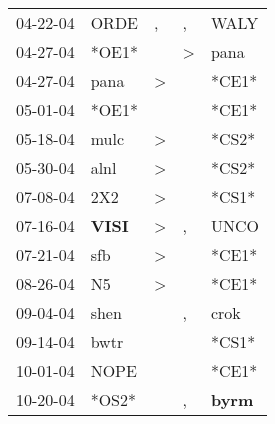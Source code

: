 \begin{supertabular}{p{0.07\textwidth}p{0.06\textwidth}p{0.02\textwidth}p{0.02\textwidth}p{0.06\textwidth}}
          04-22-04\textsuperscript{} &           ORDE\textsuperscript{} &                , &                , &           WALY\textsuperscript{} \\
          04-27-04\textsuperscript{} &                            *OE1* &                  &     \textgreater &           pana\textsuperscript{} \\
          04-27-04\textsuperscript{} &           pana\textsuperscript{} &     \textgreater &                  &                            *CE1* \\
          05-01-04\textsuperscript{} &                            *OE1* &                  &                  &                            *CE1* \\
          05-18-04\textsuperscript{} &           mulc\textsuperscript{} &     \textgreater &                  &                            *CS2* \\
          05-30-04\textsuperscript{} &           alnl\textsuperscript{} &     \textgreater &                  &                            *CS2* \\
          07-08-04\textsuperscript{} &            2X2\textsuperscript{} &     \textgreater &                  &                            *CS1* \\
          07-16-04\textsuperscript{} &  \textbf{VISI\textsuperscript{}} &     \textgreater &                , &           UNCO\textsuperscript{} \\
          07-21-04\textsuperscript{} &            sfb\textsuperscript{} &     \textgreater &                  &                            *CE1* \\
          08-26-04\textsuperscript{} &             N5\textsuperscript{} &     \textgreater &                  &                            *CE1* \\
          09-04-04\textsuperscript{} &           shen\textsuperscript{} &                  &                , &           crok\textsuperscript{} \\
          09-14-04\textsuperscript{} &           bwtr\textsuperscript{} &                  &                  &                            *CS1* \\
          10-01-04\textsuperscript{} &           NOPE\textsuperscript{} &                  &                  &                            *CE1* \\
          10-20-04\textsuperscript{} &                            *OS2* &                  &                , &  \textbf{byrm\textsuperscript{}} \\

\end{supertabular}
